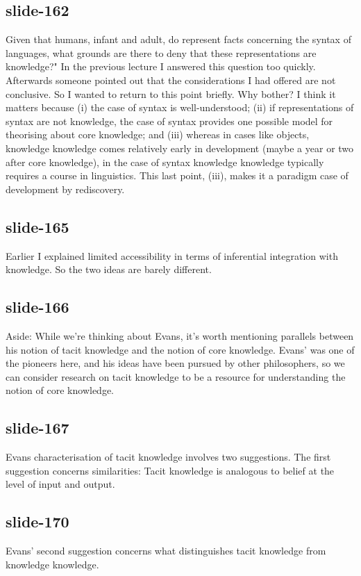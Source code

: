 \documentclass[12pt,\papersize]{extarticle}
\begin{document}
 
\subsection{slide-162}
Given that humans, infant and adult, do represent facts concerning the syntax of languages, what grounds are there to deny that these representations are knowledge?"
In the previous lecture I answered this question too quickly. Afterwards someone pointed out that the considerations I had offered are not conclusive. So I wanted to return to this point briefly.
Why bother? I think it matters because (i) the case of syntax is well-understood; (ii) if representations of syntax are not knowledge, the case of syntax provides one possible model for theorising about core knowledge; and (iii) whereas in cases like objects, knowledge knowledge comes relatively early in development (maybe a year or two after core knowledge), in the case of syntax knowledge knowledge typically requires a course in linguistics.
This last point, (iii), makes it a paradigm case of development by rediscovery.
 
 
\subsection{slide-165}
Earlier I explained limited accessibility in terms of inferential integration with knowledge. So the two ideas are barely different.
 
 
\subsection{slide-166}
Aside: While we're thinking about Evans, it's worth mentioning parallels between his notion of tacit knowledge and the notion of core knowledge.
Evans' was one of the pioneers here, and his ideas have been pursued by other philosophers, so we can consider research on tacit knowledge to be a resource for understanding the notion of core knowledge.
 
 
\subsection{slide-167}
Evans characterisation of tacit knowledge involves two suggestions.
The first suggestion concerns similarities:
Tacit knowledge is analogous to belief at the level of input and output.
 
 
\subsection{slide-170}
Evans’ second suggestion concerns what distinguishes tacit knowledge from knowledge knowledge.
 
\end{document}
